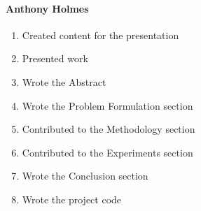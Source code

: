 \paragraph{Anthony Holmes}
\begin{enumerate}
    \item Created content for the presentation
    \item Presented work
    \item Wrote the Abstract
    \item Wrote the Problem Formulation section
    \item Contributed to the Methodology section
    \item Contributed to the Experiments section
    \item Wrote the Conclusion section
    \item Wrote the project code
    
\end{enumerate}